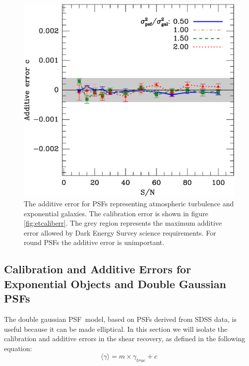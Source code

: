 \documentclass[10pt,preprint]{aastex}
\newcommand{\psf}{PSF}
\begin{document}
\begin{figure}[t] \centering
 \centering 
 \includegraphics[scale=0.65]{figures/set-s2n-et03-c-vs-shear.eps}

 \caption{The additive error for \psf s representing atmospheric turbulence and
 exponential galaxies.  The calibration error is shown in figure
 \ref{fig:etcaliberr}.  The grey region represents the maximum additive error
 allowed by Dark Energy Survey science requirements.  For round \psf s the
 additive error is unimportant. } 

 \label{fig:etverifyadditive}
\end{figure}





\subsection{Calibration and Additive Errors for Exponential Objects and Double
Gaussian \psf s}

The double gaussian \psf\ model, based on \psf s derived from SDSS data, is
useful because it can be made elliptical.  In this section we will isolate the
calibration and additive errors in the shear recovery, as defined in the
following equation:
\begin{equation}
\langle \gamma \rangle = m\times \gamma_{true} + c
\end{equation}
\end{document}
